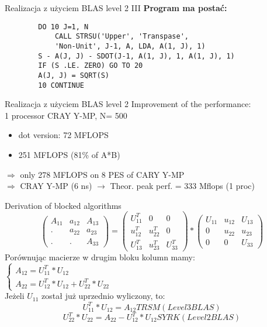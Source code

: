 	\begin{frame}[fragile]{Realizacja z użyciem BLAS level 2 III}
		\textbf{Program ma postać:}
		\begin{lstlisting}
		DO 10 J=1, N
			CALL STRSU('Upper', 'Transpase', 
			'Non-Unit', J-1, A, LDA, A(1, J), 1)
		S - A(J, J) - SDOT(J-1, A(1, J), 1, A(1, J), 1)
		IF (S .LE. ZERO) GO TO 20
		A(J, J) = SQRT(S)
		10 CONTINUE
		\end{lstlisting}
		
	\end{frame}
	\begin{frame}{Realizacja z użyciem BLAS level 2}
	Improvement of the performance: \\ 
	1 processor CRAY Y-MP, N= 500 \\
	\begin{itemize}
		\item dot version: 72 MFLOPS
		\item 251 MFLOPS (81\% of A*B)
	\end{itemize}
	$\Rightarrow$ only 278 MFLOPS on 8 PES of CARY Y-MP \\
	$\Rightarrow$ CRAY Y-MP (6 ns) $\rightarrow$ Theor. peak perf. = 333 Mflops (1 proc)
	\end{frame}
	\begin{frame}{Derivation of blocked algorithms}
	$$
		\begin{pmatrix}
		A_{11} & a_{12} & A_{13} \\
		. & a_{22} & a_{23} \\
		. & . & A_{33}
		\end{pmatrix}
		=
		\begin{pmatrix}
		U_{11}^T & 0 & 0 \\
		u_{12}^T & u_{22}^T & 0 \\
		U_{13}^T & u_{23}^T & U_{33}^T
		\end{pmatrix}
		*
		\begin{pmatrix}
		U_{11} & u_{12}  & U_{13} \\
		0 & u_{22} & u_{23} \\
		0 & 0 & U_{33}
		\end{pmatrix}
	$$
	Porównując macierze w drugim bloku kolumn mamy:
	$
	\begin{cases}
		A_{12} = U_{11}^T * U_{12} \\
		A_{22} = U_{12}^T * U_{12} + U_{22}^T * U_{22}
	\end{cases}
	$ \\ 
	Jeżeli $U_{11}$ został już uprzednio wyliczony, to:
	$$
		U_{11}^T * U_{12} = A_{12} TRSM (Level 3 BLAS)
	$$
	$$
		U_{22}^T * U_{22} = A_{22} - U_{12}^T * U_{12} SYRK(Level 2 BLAS)
	$$
	\end{frame}
	
